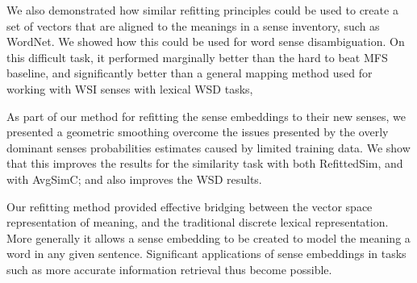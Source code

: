 \documentclass{sig-alternate}
\begin{document}
We also demonstrated how similar refitting principles could be used to create a set of vectors that are aligned to the meanings in a sense inventory, such as WordNet. We showed how this could be used for word sense disambiguation. On this difficult task, it performed marginally better than the hard to beat MFS baseline, and significantly better than a general mapping method used for working with WSI senses with lexical WSD tasks,

As part of our method for refitting the sense embeddings to their new senses, we presented a geometric smoothing overcome the issues presented by the overly dominant senses probabilities estimates caused by limited training data.
We show that this improves the results for the similarity task with both RefittedSim, and with AvgSimC; and also improves the WSD results.

Our refitting method provided effective bridging between the vector space representation of meaning, and the traditional discrete lexical representation. More generally it allows a sense embedding to be created to model the meaning a word in any given sentence. Significant applications  of sense embeddings in tasks such as more accurate information retrieval thus become possible.




\newpage
{}
\printbibliography
\end{document}
